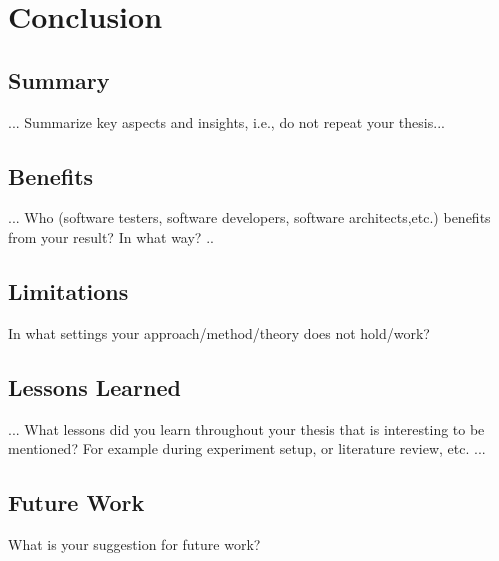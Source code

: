 
\section{Conclusion}\label{chap:conclusion}


\subsection{Summary}
... Summarize key aspects and insights, i.e., do not repeat your thesis...
\subsection{Benefits}
... Who (software testers, software developers, software architects,etc.) benefits from your result? In what way?   ..
\subsection{Limitations}
In what settings your approach/method/theory does not hold/work?
\subsection{Lessons Learned}
... What lessons did you learn throughout your thesis that is interesting to be mentioned? For example during experiment setup, or literature review, etc. ... 
\subsection{Future Work}
What is your suggestion for future work?